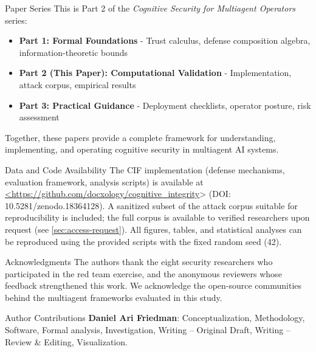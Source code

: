 \documentclass[
  ignorenonframetext,
]{beamer}
\providecommand{\tightlist}{%
  \setlength{\itemsep}{0pt}\setlength{\parskip}{0pt}}
\begin{document}
\begin{frame}{Paper Series}
\protect{}\label{paper-series}
This is Part 2 of the \emph{Cognitive Security for Multiagent Operators}
series:

\begin{itemize}
\tightlist
\item
  \textbf{Part 1: Formal Foundations} - Trust calculus, defense
  composition algebra, information-theoretic bounds
\item
  \textbf{Part 2 (This Paper): Computational Validation} -
  Implementation, attack corpus, empirical results
\item
  \textbf{Part 3: Practical Guidance} - Deployment checklists, operator
  posture, risk assessment
\end{itemize}

Together, these papers provide a complete framework for understanding,
implementing, and operating cognitive security in multiagent AI systems.
\end{frame}

\begin{frame}{Data and Code Availability}
\protect{}\label{data-and-code-availability}
The CIF implementation (defense mechanisms, evaluation framework,
analysis scripts) is available at
\url{<https://github.com/docxology/cognitive_integrity}\textgreater{}
(DOI: 10.5281/zenodo.18364128). A sanitized subset of the attack corpus
suitable for reproducibility is included; the full corpus is available
to verified researchers upon request (see \cref{sec:access-request}).
All figures, tables, and statistical analyses can be reproduced using
the provided scripts with the fixed random seed (42).
\end{frame}

\begin{frame}{Acknowledgments}
\protect{}\label{acknowledgments}
The authors thank the eight security researchers who participated in the
red team exercise, and the anonymous reviewers whose feedback
strengthened this work. We acknowledge the open-source communities
behind the multiagent frameworks evaluated in this study.
\end{frame}

\begin{frame}{Author Contributions}
\protect{}\label{author-contributions}
\textbf{Daniel Ari Friedman}: Conceptualization, Methodology, Software,
Formal analysis, Investigation, Writing -- Original Draft, Writing --
Review \& Editing, Visualization.
\end{frame}
\end{document}
